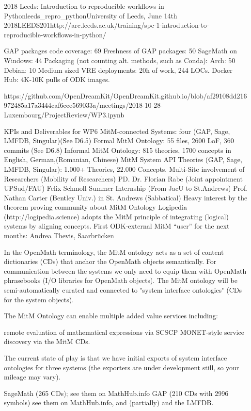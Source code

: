 \begin{Aim 1}
\begin{Aim 2}
\begin{event}{2018 Leeds: Introduction to reproducible workflows in Python}{leeds_repro_python}{University of Leeds, June 14th 2018}{LEEDS}{20}{1}{http://arc.leeds.ac.uk/training/spc-1-introduction-to-reproducible-workflows-in-python/}
\begin{itemize}
         GAP packages code coverage: 69%
Freshness of GAP packages: 50%
SageMath on Windows: 44%
Packaging (not counting alt. methods, such as Conda):
Arch: 50%
Debian: 10%
Medium sized VRE deployments: 20h of work, 244 LOCs.
Docker Hub: 4K-10K pulls of ODK images.

https://github.com/OpenDreamKit/OpenDreamKit.github.io/blob/af29108dd216972485a17a3444caf6eee569033a/meetings/2018-10-28-Luxembourg/ProjectReview/WP3.ipynb

KPIs and Deliverables for WP6
MitM-connected Systems: four (GAP, Sage, LMFDB, Singular)(See D6.5)
Formal MitM Ontology: 55 files, 2600 LoF, 360 commits (See D6.8)
Informal MitM Ontology: 815 theories, 1700 concepts in English, German,(Romanian, Chinese)
MitM System API Theories (GAP, Sage, LMFDB, Singular): 1.000+ Theories, 22.000 Concepts.
Multi-Site involvement of Researchers (Mobility of Researchers)
PD. Dr. Florian Rabe (Joint appointment UPSud/FAU)
Felix Schmoll Summer Internship (From JacU to St.Andrews)
Prof. Nathan Carter (Bentley Univ.) in St. Andrews (Sabbatical)
Heavy interest by the theorem proving community about MitM Ontology
Logipedia (http://logipedia.science) adopts the MitM principle of integrating (logical) systems by aligning concepts.
First ODK-external MitM “user” for the next months: Andrea Thevis, Saarbrücken 





In the OpenMath terminology, the MitM ontology acts as a set of content dictionaries (CDs) that anchor the OpenMath objects semantically. 
For communication between the systems we only need to equip them with OpenMath phrasebooks (I/O libraries for OpenMath objects). The MitM 
ontology will be semi-automatically curated and connected to "system interface ontologies" (CDs for the system objects).

The MitM Ontology can enable multiple added value services including:

    remote evaluation of mathematical expressions via SCSCP
    MONET-style service discovery via the MitM CDs.

The current state of play is that we have initial exports of system interface ontologies for three systems (the exporters are under development still, so your mileage may vary).

    SageMath (265 CDs); see them on MathHub.info
    GAP (210 CDs with 2996 symbols) see them on MathHub.info, and
    (partially) and the LMFDB.


\end{itemize}
\end{event}
\end{Aim 2}
\end{Aim 1}
